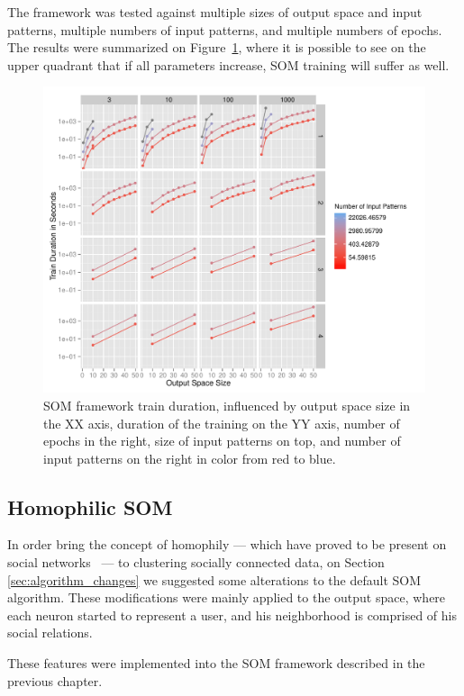 \documentclass[journal]{IEEEtran}
\begin{document}
The framework was tested against multiple sizes of output space and input patterns, multiple numbers of input patterns, and multiple numbers of epochs. 
The results were summarized on Figure~\ref{fig:benchmarkingsom}, where it is possible to see on the upper quadrant that if all parameters increase, \ac{SOM} training will suffer as well.

\begin{figure}[h]
  \centering
  \includegraphics[width=1\linewidth]{./plots/som/benchmarking.pdf}
  \caption{SOM framework train duration, influenced by output space size in the XX axis, duration of the training on the YY axis, number of epochs in the right, size of input patterns on top, and number of input patterns on the right in color from red to blue.}
  \label{fig:benchmarkingsom}
\end{figure}

\subsection{Homophilic SOM}
\label{sec:homophilic_som}
In order bring the concept of homophily --- which have proved to be present on social networks~\cite[]{Wehrens2007}  --- to clustering socially connected data, on Section \ref{sec:algorithm_changes} we suggested some alterations to the default \ac{SOM} algorithm. These modifications were mainly applied to the output space, where each neuron started to represent a user, and his neighborhood is comprised of his social relations.

These features were implemented into the \ac{SOM} framework described in the previous chapter.
\end{document}
